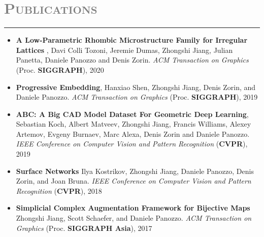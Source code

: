 \documentclass[letterpaper,11pt]{article}
\newcommand{\resheading}[1]{
\vspace{0pt}
\section*{\scshape \textcolor{gray}{#1}}
\rule{\textwidth}{0.5pt}
  \vspace{-15pt}
}
\begin{document}
%

\resheading{Publications}
\vspace{-2pt}
\begin{itemize}[label=,leftmargin=*]

\item \textbf{A Low-Parametric Rhombic Microstructure Family for Irregular Lattices
},
Davi Colli Tozoni, Jeremie Dumas, Zhongshi Jiang, Julian Panetta, Daniele Panozzo and Denis Zorin.
\textit{ACM Transaction on Graphics} (Proc. \textbf{SIGGRAPH}), 2020
\item \textbf{Progressive Embedding},
Hanxiao Shen, Zhongshi Jiang, Denis Zorin, and Daniele Panozzo.
\textit{ACM Transaction on Graphics} (Proc. \textbf{SIGGRAPH}), 2019

\item \textbf{ABC: A Big CAD Model Dataset For Geometric Deep Learning},
Sebastian Koch, Albert Matveev, Zhongshi Jiang, Francis Williams, Alexey Artemov, Evgeny Burnaev, Marc Alexa, Denis Zorin and Daniele Panozzo.
\textit{IEEE Conference on Computer Vision and Pattern Recognition} (\textbf{CVPR}), 2019

\item \textbf{Surface Networks}
Ilya Kostrikov, Zhongshi Jiang, Daniele Panozzo, Denis Zorin, and Joan Bruna.
\textit{IEEE Conference on Computer Vision and Pattern Recognition} (\textbf{CVPR}), 2018

\item \textbf{Simplicial Complex Augmentation Framework for Bijective Maps}
Zhongshi Jiang, Scott Schaefer, and Daniele Panozzo.
\textit{ACM Transaction on Graphics} (Proc. \textbf{SIGGRAPH Asia}), 2017
\end{itemize}
\end{document}
